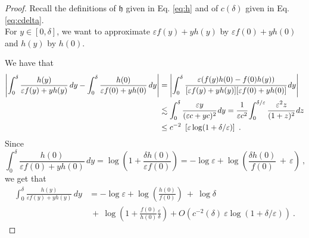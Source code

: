 \documentclass[reqno, 12pt, a4paper]{amsart}
\theoremstyle{plain}
\theoremstyle{definition}
\begin{document}
\begin{proof}
Recall the definitions of ${\mathfrak h}$ given in Eq. \eqref{eq:h} and of $c(\delta)$ given in Eq. \eqref{eq:cdelta}.\\


For $y \in [0,\delta]$, we want to approximate $\varepsilon f(y) + yh(y)$ by $\varepsilon f(0) + y h(0)$ and $h(y)$ by $h(0)$.

We have that 
\begin{equation}
\begin{split}
\left\vert \int_0^\delta \frac{h(y)}{\varepsilon f(y) + yh(y)} \, dy - \int_0^\delta \frac{h(0)}{\varepsilon f(0) + y h(0)} \, dy \right\vert &= \left\vert \int_0^\delta \cfrac{\varepsilon (f(y)h(0) - f(0) h(y) )}{[\varepsilon f(y) + y h(y)][\varepsilon f(0) + y h(0)]} \, dy\right\vert \\
&\lesssim \int_0^\delta \cfrac{\varepsilon y}{(\varepsilon c + yc)^2} \, dy = \cfrac{1}{\varepsilon c^2} \int_0^{\delta/\varepsilon} \cfrac{\varepsilon^2 z}{(1+z)^2} \, dz \\
&\le c^{-2} \ \left[ \varepsilon \log (1+ \delta/\varepsilon)\right]      \ .   
\end{split}
\end{equation}
Since
\begin{equation}
\int_0^\delta \frac{h(0)}{\varepsilon f(0) + y h(0)} \, dy =  \log\left(1 + \frac{\delta h(0)}{\varepsilon f(0)}\right) =-  \log \varepsilon + \log\left(\frac{\delta h(0)}{f(0)} \, + \, \varepsilon \right) \ ,
\end{equation}
we get that 
\begin{equation}
\begin{split}
\int_0^\delta  \frac{h(y)}{\varepsilon f(y) + yh(y)} \, dy & = -  \log \varepsilon + \log\left(\frac{h(0)}{f(0)}\right) \ + \ \log \delta\\
& \ + \ \log \left( 1+ \frac{f(0)}{h(0)} \frac{\varepsilon}{\delta} \right)  +  O (c^{-2} (\delta) \  \varepsilon \log (1+ \delta/\varepsilon))   \  .
\end{split}
\end{equation}


\bigskip 


\end{proof}
\end{document}
